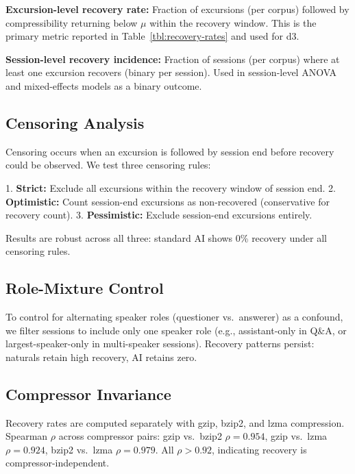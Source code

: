 \documentclass[final]{clv2025}
\begin{document}
\textbf{Excursion-level recovery rate:} Fraction of excursions (per corpus) followed by compressibility returning below $\mu$ within the recovery window. This is the primary metric reported in Table~\ref{tbl:recovery-rates} and used for d3.

\textbf{Session-level recovery incidence:} Fraction of sessions (per corpus) where at least one excursion recovers (binary per session). Used in session-level ANOVA and mixed-effects models as a binary outcome.

\subsection{Censoring Analysis}

Censoring occurs when an excursion is followed by session end before recovery could be observed. We test three censoring rules:

1. \textbf{Strict:} Exclude all excursions within the recovery window of session end.
2. \textbf{Optimistic:} Count session-end excursions as non-recovered (conservative for recovery count).
3. \textbf{Pessimistic:} Exclude session-end excursions entirely.

Results are robust across all three: standard AI shows 0\% recovery under all censoring rules.

\subsection{Role-Mixture Control}

To control for alternating speaker roles (questioner vs.\ answerer) as a confound, we filter sessions to include only one speaker role (e.g., assistant-only in Q\&A, or largest-speaker-only in multi-speaker sessions). Recovery patterns persist: naturals retain high recovery, AI retains zero.

\FloatBarrier


\subsection{Compressor Invariance}

Recovery rates are computed separately with gzip, bzip2, and lzma compression. Spearman $\rho$ across compressor pairs: gzip vs.\ bzip2 $\rho = 0.954$, gzip vs.\ lzma $\rho = 0.924$, bzip2 vs.\ lzma $\rho = 0.979$. All $\rho > 0.92$, indicating recovery is compressor-independent.
\end{document}
